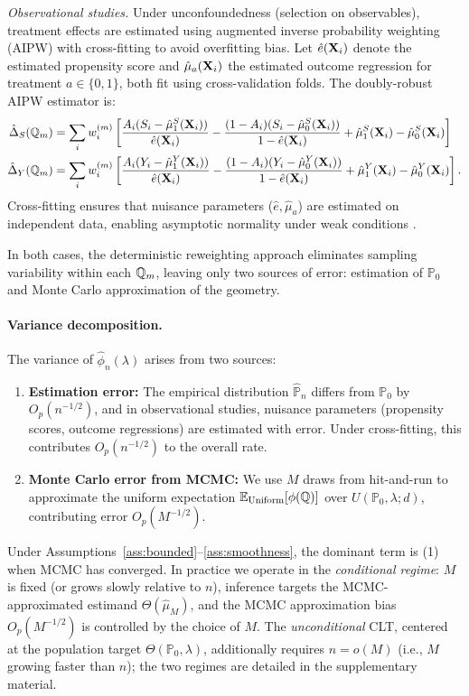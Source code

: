 \documentclass{article}
\newcommand{\PP}{\mathbb{P}}
\begin{document}
\textit{Observational studies.} Under unconfoundedness (selection on observables), treatment effects are estimated using augmented inverse probability weighting (AIPW) with cross-fitting to avoid overfitting bias. Let $\hat{e}(\mathbf{X}_i)$ denote the estimated propensity score and $\hat{\mu}_a(\mathbf{X}_i)$ the estimated outcome regression for treatment $a \in \{0,1\}$, both fit using cross-validation folds. The doubly-robust AIPW estimator is:
\begin{align*}
    \hat{\Delta}_S(\mathbb{Q}_m) &= \sum_i w_i^{(m)} \left[\frac{A_i(S_i - \hat{\mu}_1^S(\mathbf{X}_i))}{\hat{e}(\mathbf{X}_i)} - \frac{(1-A_i)(S_i - \hat{\mu}_0^S(\mathbf{X}_i))}{1-\hat{e}(\mathbf{X}_i)} + \hat{\mu}_1^S(\mathbf{X}_i) - \hat{\mu}_0^S(\mathbf{X}_i)\right]\\
    \hat{\Delta}_Y(\mathbb{Q}_m) &= \sum_i w_i^{(m)} \left[\frac{A_i(Y_i - \hat{\mu}_1^Y(\mathbf{X}_i))}{\hat{e}(\mathbf{X}_i)} - \frac{(1-A_i)(Y_i - \hat{\mu}_0^Y(\mathbf{X}_i))}{1-\hat{e}(\mathbf{X}_i)} + \hat{\mu}_1^Y(\mathbf{X}_i) - \hat{\mu}_0^Y(\mathbf{X}_i)\right].
\end{align*}
Cross-fitting ensures that nuisance parameters ($\hat{e}, \hat{\mu}_a$) are estimated on independent data, enabling asymptotic normality under weak conditions \citep{chernozhukov2018,kennedy2022}.

In both cases, the deterministic reweighting approach eliminates sampling variability within each $\mathbb{Q}_m$, leaving only two sources of error: estimation of $\PP_0$ and Monte Carlo approximation of the geometry.

\paragraph{Variance decomposition.}
The variance of $\hat{\phi}_n(\lambda)$ arises from two sources:
\begin{enumerate}
    \item \textbf{Estimation error:} The empirical distribution $\hat{\PP}_n$ differs from $\PP_0$ by $O_p(n^{-1/2})$, and in observational studies, nuisance parameters (propensity scores, outcome regressions) are estimated with error. Under cross-fitting, this contributes $O_p(n^{-1/2})$ to the overall rate.
    \item \textbf{Monte Carlo error from MCMC:} We use $M$ draws from hit-and-run
          to approximate the uniform expectation $\mathbb{E}_{\text{Uniform}}[\phi(\mathbb{Q})]$ over
          $U(\PP_0, \lambda; d)$, contributing error $O_p(M^{-1/2})$.
\end{enumerate}

Under Assumptions~\ref{ass:bounded}--\ref{ass:smoothness}, the dominant term is
(1) when MCMC has converged. In practice we operate in the \emph{conditional regime}: $M$ is fixed (or grows slowly relative to $n$), inference targets the MCMC-approximated estimand $\Theta(\hat{\mu}_M)$, and the MCMC approximation bias $O_p(M^{-1/2})$ is controlled by the choice of $M$. The \emph{unconditional} CLT, centered at the population target $\Theta(\PP_0,\lambda)$, additionally requires $n = o(M)$ (i.e., $M$ growing faster than $n$); the two regimes are detailed in the supplementary material.
\end{document}
